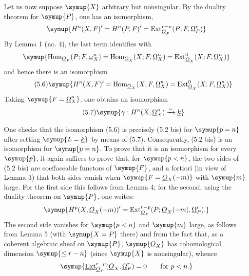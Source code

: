 Let us now suppose $\symup{X}$ arbitrary but nonsingular. By the duality theorem for $\symup{P}$, one has an
isomorphism,
\[
  \symup{H^{n}(X,F)'=H^{n}(P,F)'
  =\operatorname{Ext}_{\Osh_P}^{r-n}(P;F,\underline{\Omega}_P^{r})}
\]
By Lemma 1 (no. 4), the last term identifies with
\[
  \symup{\operatorname{Hom}_{\Osh_P}(P;F,\underline{\omega}_X^{n})
  =\operatorname{Hom}_{\Osh_X}(X;F,\underline{\Omega}_X^{n})
  =\operatorname{Ext}_{\Osh_X}^{0}(X;F,\underline{\Omega}_X^{n})}
\]
and hence there is an isomorphism
\begin{equation}\tag{5.6}
  \symup{H^{n}(X,F)'=\operatorname{Hom}_{\Osh_X}(X;F,\underline{\Omega}_X^{n})
  =\operatorname{Ext}_{\Osh_X}^{0}(X;F,\underline{\Omega}_X^{n})}
\end{equation}
Taking $\symup{F=\underline{\Omega}_X^{n}}$, one obtains an isomorphism
\begin{equation}\tag{5.7}
  \symup{\gamma:H^{n}(X,\underline{\Omega}_X^{n})\xrightarrow{\sim}\underline{k}}
\end{equation}

One checks that the isomorphism (5.6) is precisely (5.2 bis) for $\symup{p=n}$ after
setting $\symup{L=\underline{k}}$ by means of (5.7). Consequently, (5.2 bis) is an isomorphism for
$\symup{p=n}$. To prove that it is an isomorphism for every $\symup{p}$, it again suffices to
prove that, for $\symup{p<n}$, the two sides of (5.2 bis) are coeffaceable functors of
$\symup{F}$, and a fortiori (in view of Lemma 3) that both sides vanish when
$\symup{F=\Osh_X(-m)}$ with $\symup{m}$ large. For the first side this follows from Lemma 4; for
the second, using the duality theorem on $\symup{P}$, one writes:
\[
  \symup{H^{p}(X,\Osh_X(-m))'
  =\operatorname{Ext}_{\Osh_P}^{r-p}
    (P;\Osh_X(-m),\underline{\Omega}_P^{r}).}
\]
The second side vanishes for $\symup{p<n}$ and $\symup{m}$ large, as follows from Lemma 5 (with
$\symup{X=P}$ there) and from the fact that, as a coherent algebraic sheaf on $\symup{P}$,
$\symup{\Osh_X}$ has cohomological dimension $\symup{\leq r-n}$ (since $\symup{X}$ is nonsingular),
whence
\[
  \symup{\Extsh_{\Osh_P}^{r-p}(\Osh_X,\underline{\Omega}_P^{r})=0
  \qquad\text{for }p<n.}
\]


